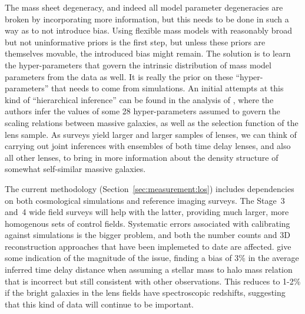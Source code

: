 The mass sheet degeneracy, and indeed all model parameter degeneracies
are broken by incorporating more information, but this needs to be done
in such a way as to not introduce bias. Using flexible mass models with
reasonably broad but not uninformative  priors is the first step, but
unless these priors are themselves movable, the introduced bias might
remain. The solution is to learn the hyper-parameters that govern the
intrinsic distribution of mass model parameters from the data as well. It is
really the prior on these ``hyper-parameters'' that  needs to come from
simulations. An initial attempts at this kind of ``hierarchical
inference'' can be found in  the analysis of \citet{SonnenfeldEtal2015},
where the authors  infer the values of some 28 hyper-parameters assumed
to govern the  scaling relations between massive galaxies, as well as
the selection function of the lens sample. As surveys yield larger and
larger samples of lenses, we can think of  carrying out joint inferences
with ensembles of both time delay lenses, and also all other lenses, to
bring in more information about the density structure of somewhat
self-similar massive galaxies.


 The
current methodology (Section~\ref{sec:measurement:los}) includes
dependencies on both cosmological simulations and reference imaging
surveys. The Stage~3 and~4  wide field surveys will help with the
latter, providing much larger, more homogenous sets of control fields.
Systematic errors associated with calibrating against simulations is the
bigger problem, and both the number counts and 3D reconstruction
approaches that have been implemeted to date are affected.
\citet{CollettEtal2013} give some indication of the magnitude of the
issue, finding a bias of 3\% in the average inferred time delay distance
when assuming a stellar mass to halo mass relation that is incorrect
but still consistent with other observations. This reduces to 1-2\%
if the bright galaxies in the lens fields have spectroscopic redshifts,
suggesting that this kind of data will continue to be important.

